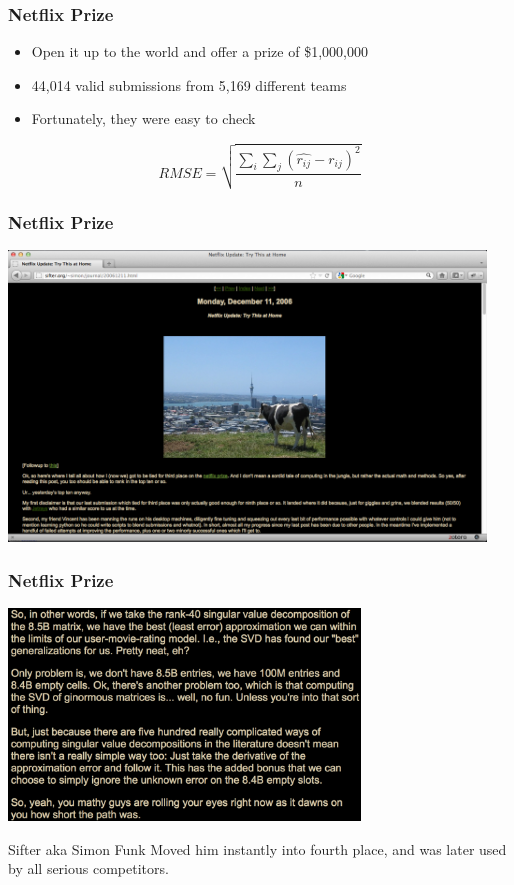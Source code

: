 \documentclass[aspectratio=169]{beamer}
\begin{document}
\begin{frame}
\frametitle{Netflix Prize}

\begin{itemize}
\item Open it up to the world and offer a prize of \$1,000,000
\item 44,014 valid submissions from 5,169 different teams
\item Fortunately, they were easy to check
\end{itemize}
\begin{equation*}
RMSE = \sqrt{ \frac{ \sum_i \sum_j (\widehat{r_{ij}} - r_{ij})^2}{n} }
\end{equation*}

\end{frame}
\begin{frame}
\frametitle{Netflix Prize}

\begin{center}
\includegraphics[width=0.95\textwidth]{figures/sifter_blog_post.png}
\end{center}

\end{frame}
\begin{frame}
\frametitle{Netflix Prize}

\begin{center}
\includegraphics[width=0.7\textwidth]{figures/funk_svd_bigger}
\end{center}
\vspace{-0.2in}
Sifter aka Simon Funk
\pause
\vfill
Moved him instantly into fourth place, and was later used by all serious competitors.

\end{frame}
\end{document}
